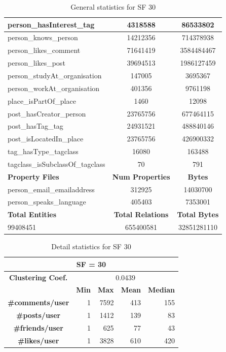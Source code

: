 \begin{table}[H]
\begin{tabular} {| l | c | c |}
        \hline
        person\_hasInterest\_tag & 4318588 & 86533802 \\
        \hline
        person\_knows\_person & 14212356 & 714378938 \\
        \hline
        person\_likes\_comment & 71641419 & 3584484467 \\
        \hline
        person\_likes\_post & 39694513 & 1986127459 \\
        \hline
        person\_studyAt\_organisation & 147005 & 3695367 \\
        \hline
        person\_workAt\_organisation & 401356 & 9761198 \\
        \hline
        place\_isPartOf\_place & 1460 & 12098 \\
        \hline
        post\_hasCreator\_person & 23765756 & 677464115 \\
        \hline
        post\_hasTag\_tag & 24931521 & 488840146 \\
        \hline
        post\_isLocatedIn\_place & 23765756 & 426900332 \\
        \hline
        tag\_hasType\_tagclass & 16080 & 163488 \\
        \hline
        tagclass\_isSubclassOf\_tagclass & 70 & 791 \\
        \hline
        \hline
        \textbf{Property Files} & \textbf{Num Properties} & \textbf{Bytes} \\
        \hline
        \hline
        person\_email\_emailaddress & 312925 & 14030700 \\
        \hline
        person\_speaks\_language & 405403 & 7353001 \\
        \hline
        \hline
        \textbf{Total Entities} & \textbf{Total Relations} & \textbf{Total Bytes} \\
        \hline
        \hline
         99408451 & 655400581 & 32851281110 \\
        \hline
    \end{tabular}
    \caption{General statistics for SF 30}
\end{table}

\begin{table}[H]
    \centering
\begin{tabular}{|c||r|r|r|r|}
\hline    \multicolumn{5}{|c|}{SF = 30 }  \\
\hline   \textbf{Clustering Coef.} &   \multicolumn{4}{|c|}{0.0439} \\
                            \hline & \textbf{Min} & \textbf{Max} & \textbf{Mean} & \textbf{Median}   \\
 \hline  \textbf{\#comments/user}  &1 &  7592 & 413 & 155 \\
    \hline  \textbf{\#posts/user}  &1 &  1412 & 139 & 83 \\
  \hline  \textbf{\#friends/user}  &1 &  625 & 77 & 43 \\
    \hline  \textbf{\#likes/user}  &1 &  3828 & 610 & 420 \\
\hline
\end{tabular}
\caption{Detail statistics for SF 30}
\end{table}

